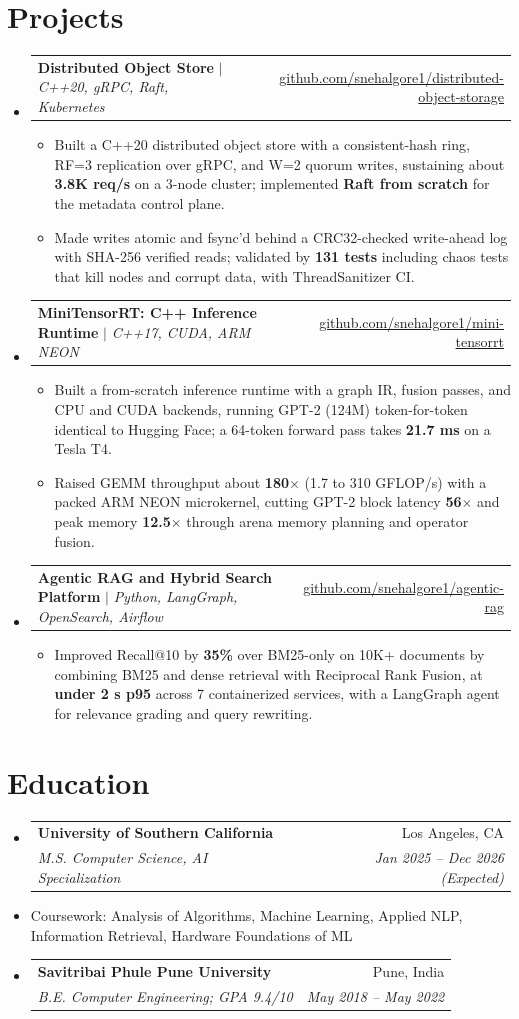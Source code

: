\documentclass[letterpaper,10pt]{article}
\makeatletter
\newcommand{\entry}[4]{\item[]\begin{tabular*}{\linewidth}[t]{l@{\extracolsep{\fill}}r}\textbf{#1} & #2\\ \textit{\small#3} & \textit{\small#4}\\\end{tabular*}\vspace{-6pt}}
\newcommand{\proj}[2]{\item[]\begin{tabular*}{\linewidth}{l@{\extracolsep{\fill}}r}\small#1 & \small#2\\\end{tabular*}\vspace{-6pt}}
\newcommand{\pt}[1]{\item\small{#1\vspace{-2.5pt}}}
\newcommand{\listS}{\begin{itemize}[leftmargin=0.15in,label={}]}
\newcommand{\listE}{\end{itemize}}
\newcommand{\bS}{\begin{itemize}[leftmargin=0.18in,label={-}]}
\newcommand{\bE}{\end{itemize}\vspace{-4pt}}
\makeatother
\begin{document}
\section{Projects}
\listS
\proj{\textbf{Distributed Object Store} $|$ \emph{C++20, gRPC, Raft, Kubernetes}}{\href{https://github.com/snehalgore1/distributed-object-storage}{github.com/snehalgore1/distributed-object-storage}}
\bS
\pt{Built a C++20 distributed object store with a consistent-hash ring, RF=3 replication over gRPC, and W=2 quorum writes, sustaining about \textbf{3.8K req/s} on a 3-node cluster; implemented \textbf{Raft from scratch} for the metadata control plane.}
\pt{Made writes atomic and fsync'd behind a CRC32-checked write-ahead log with SHA-256 verified reads; validated by \textbf{131 tests} including chaos tests that kill nodes and corrupt data, with ThreadSanitizer CI.}
\bE
\proj{\textbf{MiniTensorRT: C++ Inference Runtime} $|$ \emph{C++17, CUDA, ARM NEON}}{\href{https://github.com/snehalgore1/mini-tensorrt}{github.com/snehalgore1/mini-tensorrt}}
\bS
\pt{Built a from-scratch inference runtime with a graph IR, fusion passes, and CPU and CUDA backends, running GPT-2 (124M) token-for-token identical to Hugging Face; a 64-token forward pass takes \textbf{21.7 ms} on a Tesla T4.}
\pt{Raised GEMM throughput about \textbf{180$\times$} (1.7 to 310 GFLOP/s) with a packed ARM NEON microkernel, cutting GPT-2 block latency \textbf{56$\times$} and peak memory \textbf{12.5$\times$} through arena memory planning and operator fusion.}
\bE
\proj{\textbf{Agentic RAG and Hybrid Search Platform} $|$ \emph{Python, LangGraph, OpenSearch, Airflow}}{\href{https://github.com/snehalgore1/agentic-rag}{github.com/snehalgore1/agentic-rag}}
\bS
\pt{Improved Recall@10 by \textbf{35\%} over BM25-only on 10K+ documents by combining BM25 and dense retrieval with Reciprocal Rank Fusion, at \textbf{under 2 s p95} across 7 containerized services, with a LangGraph agent for relevance grading and query rewriting.}
\bE
\listE

\section{Education}
\listS
\entry{University of Southern California}{Los Angeles, CA}{M.S. Computer Science, AI Specialization}{Jan 2025 -- Dec 2026 (Expected)}
\item[]\small Coursework: Analysis of Algorithms, Machine Learning, Applied NLP, Information Retrieval, Hardware Foundations of ML\vspace{-3pt}
\entry{Savitribai Phule Pune University}{Pune, India}{B.E. Computer Engineering; GPA 9.4/10}{May 2018 -- May 2022}
\listE
\end{document}
